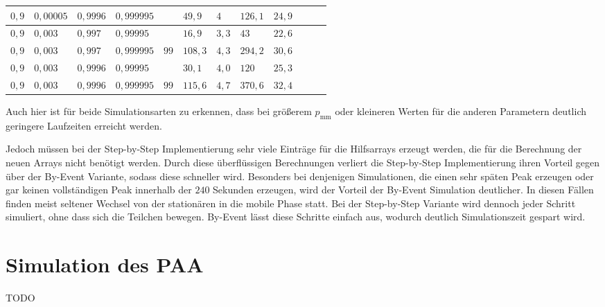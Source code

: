 \begin{table}[h]
\begin{tabular}{|l|l|l|l||l||l|l|l|l|l|l|l|}
$ 0,9  $ & $0,00005$ & $0,9996$ & $0,999995$ && $49,9   $ & $4 $     & $126,1 $ & $24,9 $  \\ \hline
$ 0,9  $ & $0,003 $  & $0,997$  & $0,99995$  && $16,9   $ & $3,3 $   & $43    $ & $22,6 $  \\ \hline
\cellcolor{gray!25}$ 0,9  $ & \cellcolor{gray!25}$0,003 $  & \cellcolor{gray!25}$0,997$  & \cellcolor{gray!25}$0,999995$ &$99$& $108,3$ & $4,3   $ & $294,2 $ & $30,6 $  \\ \hline
$ 0,9  $ & $0,003 $  & $0,9996$ & $0,99995$  && $30,1   $ & $4,0 $   & $120 $   & $25,3 $  \\ \hline
\cellcolor{gray!25}$ 0,9  $ & \cellcolor{gray!25}$0,003 $  & \cellcolor{gray!25}$0,9996$ & \cellcolor{gray!25}$0,999995$ &$99$& $115,6$ & $4,7   $ & $370,6 $ & $32,4$  \\ \hline
\end{tabular}
\end{table}
Auch hier ist für beide Simulationsarten zu erkennen, dass bei größerem $p_\text{mm}$ oder kleineren Werten für die anderen Parametern deutlich geringere Laufzeiten erreicht werden.

Jedoch müssen bei der Step-by-Step Implementierung sehr viele Einträge für die Hilfsarrays erzeugt werden, die für die Berechnung der neuen Arrays nicht benötigt werden. Durch diese überflüssigen Berechnungen verliert die Step-by-Step Implementierung ihren Vorteil gegen über der By-Event Variante, sodass diese schneller wird. Besonders bei denjenigen Simulationen, die einen sehr späten Peak erzeugen oder gar keinen vollständigen Peak innerhalb der $240$ Sekunden erzeugen, wird der Vorteil der By-Event Simulation deutlicher. In diesen Fällen finden meist seltener Wechsel von der stationären in die mobile Phase statt. Bei der Step-by-Step Variante wird dennoch jeder Schritt simuliert, ohne dass sich die Teilchen bewegen. By-Event lässt diese Schritte einfach aus, wodurch deutlich Simulationszeit gespart wird. 

\section{Simulation des PAA}
TODO

